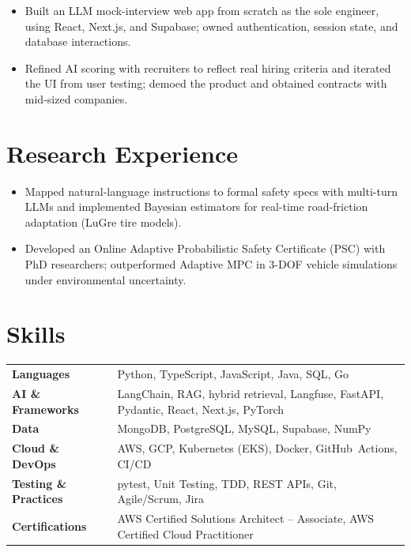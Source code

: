 \documentclass[11pt, letterpaper]{article}
\begin{document}
\vspace{1pt}
\begin{itemize}
  \item Built an LLM mock-interview web app from scratch as the sole engineer, using React, Next.js, and Supabase; owned authentication, session state, and database interactions.
  \item Refined AI scoring with recruiters to reflect real hiring criteria and iterated the UI from user testing; demoed the product and obtained contracts with mid-sized companies.
\end{itemize}

\section{Research Experience}
\begin{itemize}
  \item Mapped natural-language instructions to formal safety specs with multi-turn LLMs and implemented Bayesian estimators for real-time road-friction adaptation (LuGre tire models).
  \item Developed an Online Adaptive Probabilistic Safety Certificate (PSC) with PhD researchers; outperformed Adaptive MPC in 3-DOF vehicle simulations under environmental uncertainty.
\end{itemize}

\section{Skills}
\begin{tabularx}{\textwidth}{@{}l @{\hspace{7pt}} >{\raggedright\arraybackslash}X@{}}
  \textbf{Languages} & Python, TypeScript, JavaScript, Java, SQL, Go \\[1pt]
  \textbf{AI \& Frameworks} & LangChain, RAG, hybrid retrieval, Langfuse, FastAPI, Pydantic, React, Next.js, PyTorch \\[1pt]
  \textbf{Data} & MongoDB, PostgreSQL, MySQL, Supabase, NumPy \\[1pt]
  \textbf{Cloud \& DevOps} & AWS, GCP, Kubernetes (EKS), Docker, GitHub~Actions, CI/CD \\[1pt]
  \textbf{Testing \& Practices} & pytest, Unit Testing, TDD, REST APIs, Git, Agile/Scrum, Jira \\[1pt]
  \textbf{Certifications} & AWS Certified Solutions Architect -- Associate, AWS Certified Cloud Practitioner \\
\end{tabularx}
\end{document}
